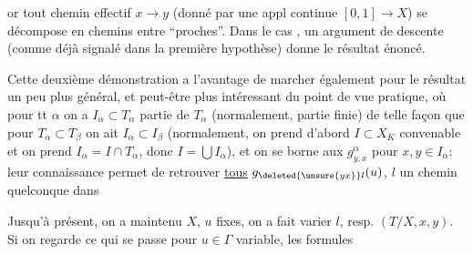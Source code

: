
or tout chemin effectif $x\longrightarrow y$ (donné par une appl continue $[0,1]\longrightarrow X$) se décompose en  chemins 
entre   ``proches''. Dans le cas  , un argument de descente (comme déjà signalé dans la première hypothèse) donne le résultat énoncé.

Cette deuxième démonstration a l'avantage de marcher également pour  le résultat un peu plus général, et peut-être plus intéressant du point de vue pratique, où pour tt $\alpha$ on a $I_\alpha\subset T_\alpha$ partie  de $T_\alpha$ (normalement, partie finie) de telle façon que pour $T_\alpha\subset T_\beta$ on ait $I_\alpha\subset I_\beta$  (normalement, on prend d'abord $I\subset X_K$ convenable et on prend $I_\alpha=I\cap T_\alpha$, donc $I=\bigcup I_\alpha$), et on se borne aux $g^\alpha_{y,x}$ pour $x,y\in I_\alpha$: leur connaissance permet de retrouver \uline{tous}  $g_{\deleted{\unsure{yx}}l}(u)$, $l$ un chemin quelconque dans


Jusqu'à présent, on a maintenu $X$, $u$ fixes, on a fait varier $l$, resp. $(T/X,x,y)$. Si on regarde ce qui se passe pour $u\in\Gamma$ variable, les formules

